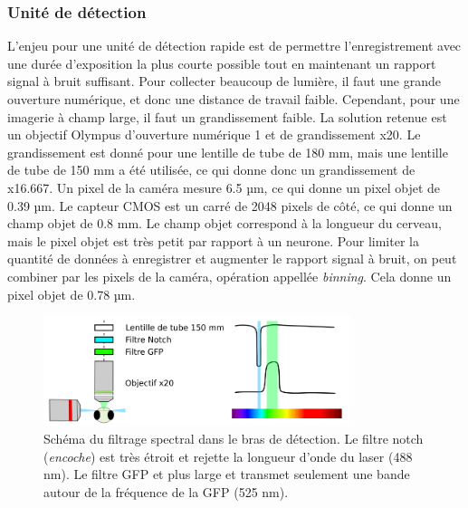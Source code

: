 \subsubsection{Unité de détection}

L'enjeu pour une unité de détection rapide est de permettre l'enregistrement avec une durée d'exposition la plus courte possible tout en maintenant un rapport signal à bruit suffisant. Pour collecter beaucoup de lumière, il faut une grande ouverture numérique, et donc une distance de travail faible. Cependant, pour une imagerie à champ large, il faut un grandissement faible. La solution retenue est un objectif Olympus d'ouverture numérique 1 et de grandissement x20. Le grandissement est donné pour une lentille de tube de 180 mm, mais une lentille de tube de 150 mm a été utilisée, ce qui donne donc un grandissement de x16.667. Un pixel de la caméra mesure 6.5 µm, ce qui donne un pixel objet de 0.39 µm. Le capteur CMOS est un carré de 2048 pixels de côté, ce qui donne un champ objet de 0.8 mm. Le champ objet correspond à la longueur du cerveau, mais le pixel objet est très petit par rapport à un neurone. Pour limiter la quantité de données à enregistrer et augmenter le rapport signal à bruit, on peut combiner par les pixels de la caméra, opération appellée \emph{binning}. Cela donne un pixel objet de 0.78 µm.

\begin{figure}
\centering
\includegraphics[width=0.8\textwidth]{./files/detection_unit.svg.png}
\caption{Schéma du filtrage spectral dans le bras de détection. Le filtre notch (\emph{encoche}) est très étroit et rejette la longueur d'onde du laser (488 nm). Le filtre GFP et plus large et transmet seulement une bande autour de la fréquence de la GFP (525 nm).}
\end{figure}


